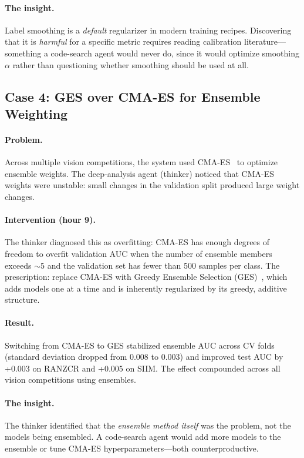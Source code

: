 \documentclass{article}
\begin{document}
\paragraph{The insight.} Label smoothing is a \emph{default} regularizer in modern training recipes. Discovering that it is \emph{harmful} for a specific metric requires reading calibration literature---something a code-search agent would never do, since it would optimize smoothing $\alpha$ rather than questioning whether smoothing should be used at all.

\subsection{Case 4: GES over CMA-ES for Ensemble Weighting}
\label{sec:case_ges}

\paragraph{Problem.} Across multiple vision competitions, the system used CMA-ES~\citep{hansen2001cma} to optimize ensemble weights. The deep-analysis agent (thinker) noticed that CMA-ES weights were unstable: small changes in the validation split produced large weight changes.

\paragraph{Intervention (hour 9).} The thinker diagnosed this as overfitting: CMA-ES has enough degrees of freedom to overfit validation AUC when the number of ensemble members exceeds $\sim$5 and the validation set has fewer than 500 samples per class. The prescription: replace CMA-ES with Greedy Ensemble Selection (GES)~\citep{caruana2004ensemble}, which adds models one at a time and is inherently regularized by its greedy, additive structure.

\paragraph{Result.} Switching from CMA-ES to GES stabilized ensemble AUC across CV folds (standard deviation dropped from 0.008 to 0.003) and improved test AUC by +0.003 on RANZCR and +0.005 on SIIM. The effect compounded across all vision competitions using ensembles.

\paragraph{The insight.} The thinker identified that the \emph{ensemble method itself} was the problem, not the models being ensembled. A code-search agent would add more models to the ensemble or tune CMA-ES hyperparameters---both counterproductive.
\end{document}
